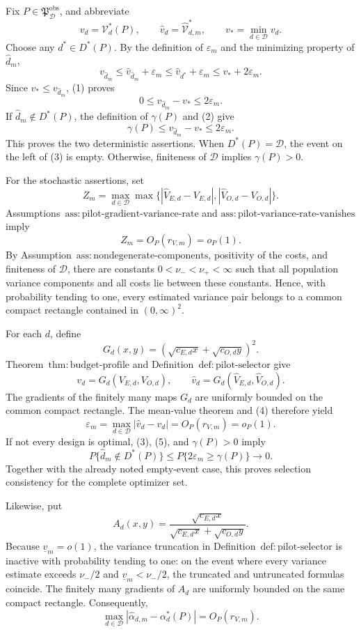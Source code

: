 Fix \(P\in\mathfrak P_{\mathcal D}^{\mathrm{obs}}\), and abbreviate
\[
 v_d=\mathcal V_d^*(P),\qquad
 \widehat v_d=\widehat{\mathcal V}_{d,m}^*,\qquad
 v_*=\min_{d\in\mathcal D}v_d.
\]
Choose any \(d^*\in D^*(P)\).  By the definition of \(\varepsilon_m\) and the minimizing property of \(\widehat d_m\),
\[
 v_{\widehat d_m}
 \le \widehat v_{\widehat d_m}+\varepsilon_m
 \le \widehat v_{d^*}+\varepsilon_m
 \le v_*+2\varepsilon_m. \tag{1}
\]
Since \(v_*\le v_{\widehat d_m}\), (1) proves
\[
 0\le v_{\widehat d_m}-v_*\le2\varepsilon_m. \tag{2}
\]
If \(\widehat d_m\notin D^*(P)\), the definition of \(\gamma(P)\) and (2) give
\[
 \gamma(P)\le v_{\widehat d_m}-v_*\le2\varepsilon_m. \tag{3}
\]
This proves the two deterministic assertions.  When \(D^*(P)=\mathcal D\), the event on the left of (3) is empty.  Otherwise, finiteness of \(\mathcal D\) implies \(\gamma(P)>0\).

For the stochastic assertions, set
\[
 Z_m=\max_{d\in\mathcal D}\max\bigl\{
 |\widehat V_{E,d}-V_{E,d}|,
 |\widehat V_{O,d}-V_{O,d}|\bigr\}.
\]
Assumptions~\(\mathrm{ass{:}pilot\text{-}gradient\text{-}variance\text{-}rate}\) and \(\mathrm{ass{:}pilot\text{-}variance\text{-}rate\text{-}vanishes}\) imply
\[
 Z_m=O_P(r_{V,m})=o_P(1). \tag{4}
\]
By Assumption~\(\mathrm{ass{:}nondegenerate\text{-}components}\), positivity of the costs, and finiteness of \(\mathcal D\), there are constants \(0<\nu_-<\nu_+<\infty\) such that all population variance components and all costs lie between these constants.  Hence, with probability tending to one, every estimated variance pair belongs to a common compact rectangle contained in \((0,\infty)^2\).

For each \(d\), define
\[
 G_d(x,y)=\left(\sqrt{c_{E,d}x}+\sqrt{c_{O,d}y}\right)^2.
\]
Theorem~\(\mathrm{thm{:}budget\text{-}profile}\) and Definition~\(\mathrm{def{:}pilot\text{-}selector}\) give
\[
 v_d=G_d(V_{E,d},V_{O,d}),
 \qquad
 \widehat v_d=G_d(\widehat V_{E,d},\widehat V_{O,d}).
\]
The gradients of the finitely many maps \(G_d\) are uniformly bounded on the common compact rectangle.  The mean-value theorem and (4) therefore yield
\[
 \varepsilon_m=\max_{d\in\mathcal D}|\widehat v_d-v_d|
 =O_P(r_{V,m})=o_P(1). \tag{5}
\]
If not every design is optimal, (3), (5), and \(\gamma(P)>0\) imply
\[
 P\{\widehat d_m\notin D^*(P)\}
 \le P\{2\varepsilon_m\ge\gamma(P)\}\longrightarrow0. \tag{6}
\]
Together with the already noted empty-event case, this proves selection consistency for the complete optimizer set.

Likewise, put
\[
 A_d(x,y)=
 \frac{\sqrt{c_{E,d}x}}
 {\sqrt{c_{E,d}x}+\sqrt{c_{O,d}y}}.
\]
Because \(\underline v_m=o(1)\), the variance truncation in Definition~\(\mathrm{def{:}pilot\text{-}selector}\) is inactive with probability tending to one: on the event where every variance estimate exceeds \(\nu_-/2\) and \(\underline v_m<\nu_-/2\), the truncated and untruncated formulas coincide.  The finitely many gradients of \(A_d\) are uniformly bounded on the same compact rectangle.  Consequently,
\[
 \max_{d\in\mathcal D}
 |\widehat\alpha_{d,m}-\alpha_d^*(P)|
 =O_P(r_{V,m}). \tag{7}
\]

